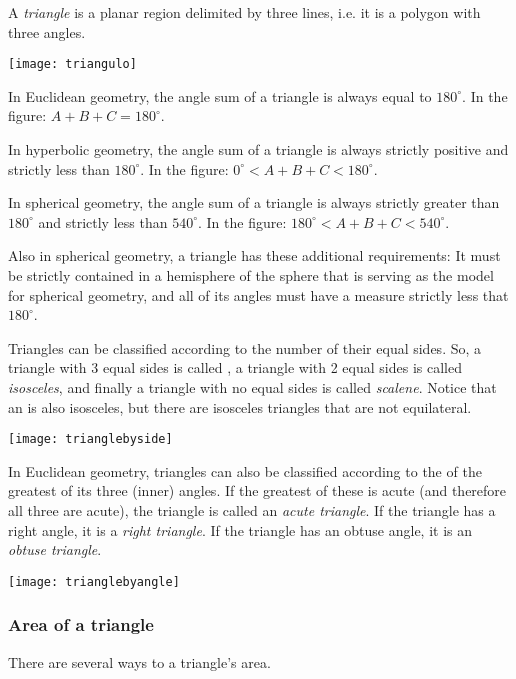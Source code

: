 \documentclass[12pt]{article}
\begin{document}
A \emph{triangle} is a  planar region delimited by three  lines, i.e. it is a polygon with three angles.

\begin{center}
\texttt{[image: triangulo]}
\end{center}

In Euclidean geometry, the angle sum of a triangle is always equal to $180^\circ$. In the figure: $A+B+C=180^\circ$.

In hyperbolic geometry, the angle sum of a triangle is always strictly positive and strictly less than $180^\circ$.  In the figure: $0^\circ<A+B+C<180^\circ$.

In spherical geometry, the angle sum of a triangle is always strictly greater than $180^\circ$ and strictly less than $540^\circ$.  In the figure:  $180^\circ<A+B+C<540^\circ$.

Also in spherical geometry, a triangle has these additional requirements:  It must be strictly contained in a hemisphere of the sphere that is serving as the model for spherical geometry, and all of its angles must have a measure strictly less that $180^{\circ}$.

Triangles can be classified according to the number of their equal sides. So, a triangle with 3 equal sides is called , a triangle with 2 equal sides is called \emph{isosceles}, and finally a triangle with no equal sides is called \emph{scalene}. Notice that an  is also isosceles, but there are isosceles triangles that are not equilateral.

\begin{center}
\texttt{[image: trianglebyside]}
\end{center}

In Euclidean geometry, triangles can also be classified according to the  of the greatest of its three (inner) angles. If the greatest of these is acute (and therefore all three are acute), the triangle is called an \emph{acute triangle}. If the triangle has a right angle, it is a \emph{right triangle}. If the triangle has an obtuse angle, it is an \emph{obtuse triangle}.

\begin{center}
\texttt{[image: trianglebyangle]}
\end{center}

\subsubsection*{Area of a triangle}
There are several ways to  a triangle's area.
\end{document}
